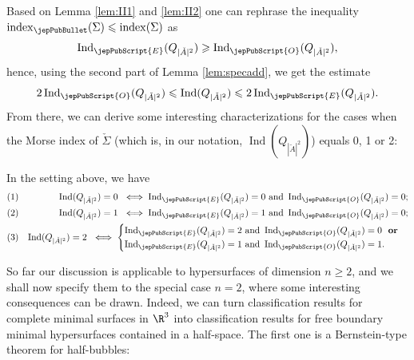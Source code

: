         Based on Lemma \ref{lem:II1} and \ref{lem:II2} one can rephrase the inequality $\operatorname{index}_{\jepPubBullet} (\Sigma)\leqslant \operatorname{index}(\Sigma)$ as
        	\begin{equation}\label{eq:EindexvsOindex}
        	\operatorname{Ind}_{{\jepPubScript{E}}}(Q_{|\check{A}|^2})\geqslant  \operatorname{Ind}_{{\jepPubScript{O}}}(Q_{|\check{A}|^2}),
        	\end{equation}
        	hence, using the second part of Lemma \ref{lem:specadd}, we get the estimate
        	\begin{equation}\label{eq:fundineq}
        	2 \operatorname{Ind}_{{\jepPubScript{O}}}(Q_{|\check{A}|^2})\leqslant \operatorname{Ind}(Q_{|\check{A}|^2})\leqslant 2 \operatorname{Ind}_{{\jepPubScript{E}}}(Q_{|\check{A}|^2}).
        	\end{equation}
        	From there, we can derive some interesting characterizations for the cases when the Morse index of $\check{\Sigma}$ (which is, in our notation, $	\operatorname{Ind}(Q_{|\check{A}|^2})$) equals 0, 1 or 2:
        	
        	\begin{cor}\label{cor:lowindex}
        		In the setting above, we have 
        		\begin{align*}
        		&\text{(1)}& 		\operatorname{Ind}(Q_{|\check{A}|^2})=0 \ \iff \operatorname{Ind}_{{\jepPubScript{E}}}(Q_{|\check{A}|^2})=0 \ \text{and} \ \operatorname{Ind}_{{\jepPubScript{O}}}(Q_{|\check{A}|^2})=0; \\
        		&\text{(2)}& 		\operatorname{Ind}(Q_{|\check{A}|^2})=1 \ \iff \operatorname{Ind}_{{\jepPubScript{E}}}(Q_{|\check{A}|^2})=1 \ \text{and} \ \operatorname{Ind}_{{\jepPubScript{O}}}(Q_{|\check{A}|^2})=0;\\
        		&\text{(3)}&		\operatorname{Ind}(Q_{|\check{A}|^2})=2 \ \iff 
        				\begin{cases}\operatorname{Ind}_{{\jepPubScript{E}}}(Q_{|\check{A}|^2})=2 \ \text{and} \ \operatorname{Ind}_{{\jepPubScript{O}}}(Q_{|\check{A}|^2})=0 \ \ \textbf{or} \\ 
        				 \operatorname{Ind}_{{\jepPubScript{E}}}(Q_{|\check{A}|^2})=1 \ \text{and} \ \operatorname{Ind}_{{\jepPubScript{O}}}(Q_{|\check{A}|^2})=1.
        				\end{cases}
        				\end{align*}
        	\end{cor}
        	
        	So far our discussion is applicable to hypersurfaces of dimension $n\geqslant 2$, and we shall now specify them to the special case $n=2$, where some interesting consequences can be drawn.
        	Indeed, we can turn classification results for complete minimal surfaces in $\R^{3}$ into classification results for free boundary minimal hypersurfaces contained in a half-space. The first one is a Bernstein-type theorem for half-bubbles:
        	

